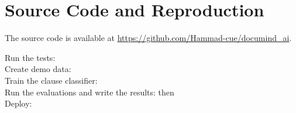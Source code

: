 \chapter{Source Code and Reproduction}
The source code is available at \url{https://github.com/Hammad-cue/documind_ai}.

\noindent Run the tests: \\
Create demo data: \\
Train the clause classifier: \\
Run the evaluations and write the results:  then \\
Deploy: 
